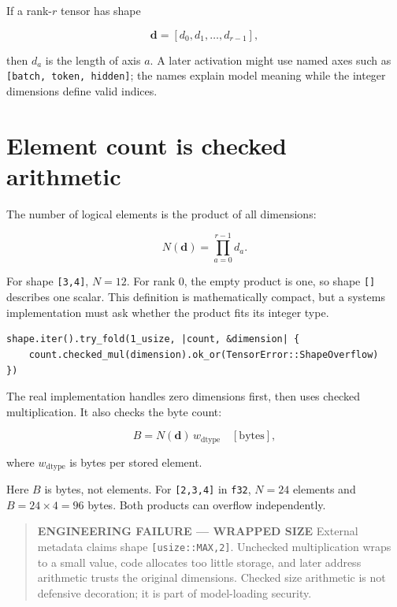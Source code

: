 If a rank-\(r\) tensor has shape

\begin{equation}
\mathbf{d} = [d_0,d_1,\ldots,d_{r-1}],
\end{equation}

then \(d_a\) is the length of axis \(a\). A later activation might use
named axes such as \texttt{{[}batch,\ token,\ hidden{]}}; the names
explain model meaning while the integer dimensions define valid indices.

\section{Element count is checked
arithmetic}\label{element-count-is-checked-arithmetic}

The number of logical elements is the product of all dimensions:

\begin{equation}
N(\mathbf{d}) = \prod_{a=0}^{r-1} d_a.
\end{equation}

For shape \texttt{{[}3,4{]}}, \(N=12\). For rank 0, the empty product is
one, so shape \texttt{{[}{]}} describes one scalar. This definition is
mathematically compact, but a systems implementation must ask whether
the product fits its integer type.

\begin{verbatim}
shape.iter().try_fold(1_usize, |count, &dimension| {
    count.checked_mul(dimension).ok_or(TensorError::ShapeOverflow)
})
\end{verbatim}

The real implementation handles zero dimensions first, then uses checked
multiplication. It also checks the byte count:

\begin{equation}
B=N(\mathbf{d})\,w_{\mathrm{dtype}}\quad[\mathrm{bytes}],
\end{equation}

where \(w_{\mathrm{dtype}}\) is bytes per stored element.

Here \(B\) is bytes, not elements. For \texttt{{[}2,3,4{]}} in
\texttt{f32}, \(N=24\) elements and \(B=24\times4=96\) bytes. Both
products can overflow independently.

\begin{quote}
\textbf{ENGINEERING FAILURE --- WRAPPED SIZE} External metadata claims
shape \texttt{{[}usize::MAX,2{]}}. Unchecked multiplication wraps to a
small value, code allocates too little storage, and later address
arithmetic trusts the original dimensions. Checked size arithmetic is
not defensive decoration; it is part of model-loading security.
\end{quote}

